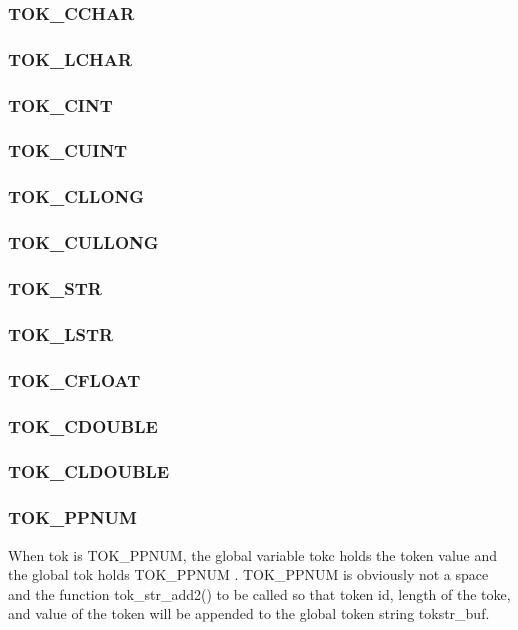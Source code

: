 \subsubsection{TOK\_CCHAR}
\subsubsection{TOK\_LCHAR}
\subsubsection{TOK\_CINT}
\subsubsection{TOK\_CUINT}
\subsubsection{TOK\_CLLONG}
\subsubsection{TOK\_CULLONG}
\subsubsection{TOK\_STR}
\subsubsection{TOK\_LSTR}
\subsubsection{TOK\_CFLOAT}
\subsubsection{TOK\_CDOUBLE}
\subsubsection{TOK\_CLDOUBLE}
\subsubsection{TOK\_PPNUM}

When tok is TOK\_PPNUM, the global variable tokc holds the token value and the global tok holds TOK\_PPNUM . TOK\_PPNUM is obviously not a space and the function tok\_str\_add2() to be called so that token id, length of the toke, and value of the token will be appended to the global token string tokstr\_buf.

